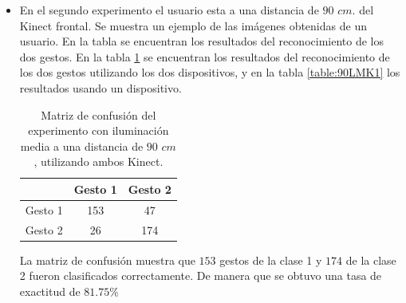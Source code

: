\begin{itemize}
La matriz de confusión muestra que $136$ gestos de la clase 1 y $193$ de la clase 2 fueron clasificados correctamente. De manera que se obtuvo una tasa de exactitud de $82.25 \%$  

En este caso se observa una mejor exactitud cuando se utiliza solo un Kinect. 


\item En el segundo experimento el usuario esta a una distancia de $90$ $cm.$ del Kinect frontal. Se muestra un ejemplo de las imágenes obtenidas de un usuario. En la tabla se encuentran los resultados del reconocimiento de los dos gestos. En la tabla \ref{table:90LMK2} se encuentran los resultados del reconocimiento de los dos gestos utilizando los dos dispositivos, y en la tabla \ref{table:90LMK1} los resultados usando un dispositivo.     


\begin{table}[h!] 
\begin{center}
\begin{tabular}{ r || c | c |}  
        & Gesto 1 & Gesto 2 \\ \hline \hline  
Gesto 1 & 153     &  47     \\ \hline  
Gesto 2 & 26      & 174     \\   
\end{tabular}
\end{center} 
\caption{Matriz de confusión del experimento con iluminación media a una distancia de $90$ $cm$, utilizando ambos Kinect.} 
\label{table:90LMK2}
\end{table}

La matriz de confusión muestra que $153$ gestos de la clase 1 y $174$ de la clase 2 fueron clasificados correctamente. De manera que se obtuvo una tasa de exactitud de $81.75 \%$ 


\end{itemize}
